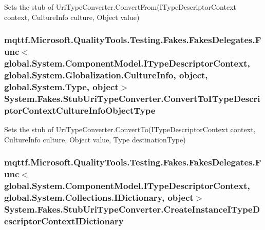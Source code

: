 Sets the stub of Uri\-Type\-Converter.\-Convert\-From(\-I\-Type\-Descriptor\-Context context, Culture\-Info culture, Object value)

\hypertarget{class_system_1_1_fakes_1_1_stub_uri_type_converter_ab43ced893a1f4cac2567df4b0619c8c8}{
\subsubsection[{Convert\-To\-I\-Type\-Descriptor\-Context\-Culture\-Info\-Object\-Type}]{\setlength{\rightskip}{0pt plus 5cm}mqttf.\-Microsoft.\-Quality\-Tools.\-Testing.\-Fakes.\-Fakes\-Delegates.\-Func$<$global.\-System.\-Component\-Model.\-I\-Type\-Descriptor\-Context, global.\-System.\-Globalization.\-Culture\-Info, object, global.\-System.\-Type, object$>$ System.\-Fakes.\-Stub\-Uri\-Type\-Converter.\-Convert\-To\-I\-Type\-Descriptor\-Context\-Culture\-Info\-Object\-Type}}\label{class_system_1_1_fakes_1_1_stub_uri_type_converter_ab43ced893a1f4cac2567df4b0619c8c8}


Sets the stub of Uri\-Type\-Converter.\-Convert\-To(\-I\-Type\-Descriptor\-Context context, Culture\-Info culture, Object value, Type destination\-Type)

\hypertarget{class_system_1_1_fakes_1_1_stub_uri_type_converter_aad35d6691a0a160689283898c368c097}{
\subsubsection[{Create\-Instance\-I\-Type\-Descriptor\-Context\-I\-Dictionary}]{\setlength{\rightskip}{0pt plus 5cm}mqttf.\-Microsoft.\-Quality\-Tools.\-Testing.\-Fakes.\-Fakes\-Delegates.\-Func$<$global.\-System.\-Component\-Model.\-I\-Type\-Descriptor\-Context, global.\-System.\-Collections.\-I\-Dictionary, object$>$ System.\-Fakes.\-Stub\-Uri\-Type\-Converter.\-Create\-Instance\-I\-Type\-Descriptor\-Context\-I\-Dictionary}}\label{class_system_1_1_fakes_1_1_stub_uri_type_converter_aad35d6691a0a160689283898c368c097}


